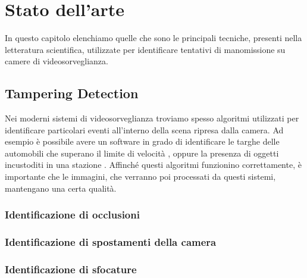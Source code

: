 \chapter{Stato dell'arte}
\label{StatoArte}
\thispagestyle{empty}

\vspace{0.5cm}

\noindent In questo capitolo elenchiamo quelle che sono le principali tecniche, presenti nella letteratura scientifica, utilizzate per identificare tentativi di manomissione su camere di videosorveglianza. 
\section{Tampering Detection}
Nei moderni sistemi di videosorveglianza troviamo spesso algoritmi utilizzati per identificare particolari eventi all'interno della scena ripresa dalla camera. 
Ad esempio \`e possibile avere un software in grado di identificare le targhe delle automobili che superano il limite di velocit\`a , oppure la presenza di oggetti incustoditi in una stazione \cite{Targhe}.
Affinch\'e questi algoritmi funzionino correttamente, \`e importante che le immagini, che verranno poi processati da questi sistemi, mantengano una certa qualit\`a.

\subsection{Identificazione di occlusioni}
\subsection{Identificazione di spostamenti della camera}
\subsection{Identificazione di sfocature} 